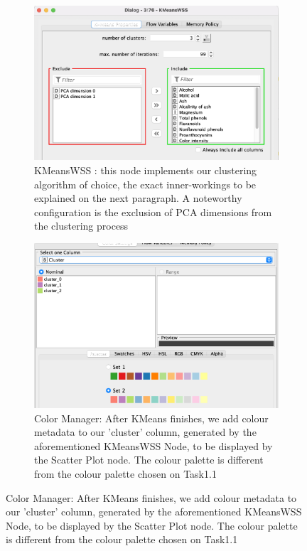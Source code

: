 \documentclass[11pt]{article}
\begin{document}
			\iffalse
			\begin{figure}[H]
				\centering
				\begin{subfigure}{0.4\textwidth}
					\includegraphics[width=\textwidth]{res/t1/t12/t12-kmeans-wss-conf}
					\caption{KMeansWSS : this node implements our clustering algorithm of choice, the exact inner-workings to be explained on the next paragraph. A noteworthy configuration is the exclusion of PCA dimensions from the clustering process}
					\label{fig:first}
				\end{subfigure}
				\hfill
				\begin{subfigure}{0.4\textwidth}
					\includegraphics[width=\textwidth]{res/t1/t12/t12-color-manager-conf}
					\caption{Color Manager: After KMeans finishes, we add colour metadata to our 'cluster' column, generated by the aforementioned KMeansWSS Node, to be displayed by the Scatter Plot node. The colour palette is different from the colour palette chosen on Task1.1}
					\label{fig:second}
				\end{subfigure}
				\hfill
			\end{figure}
\end{document}
